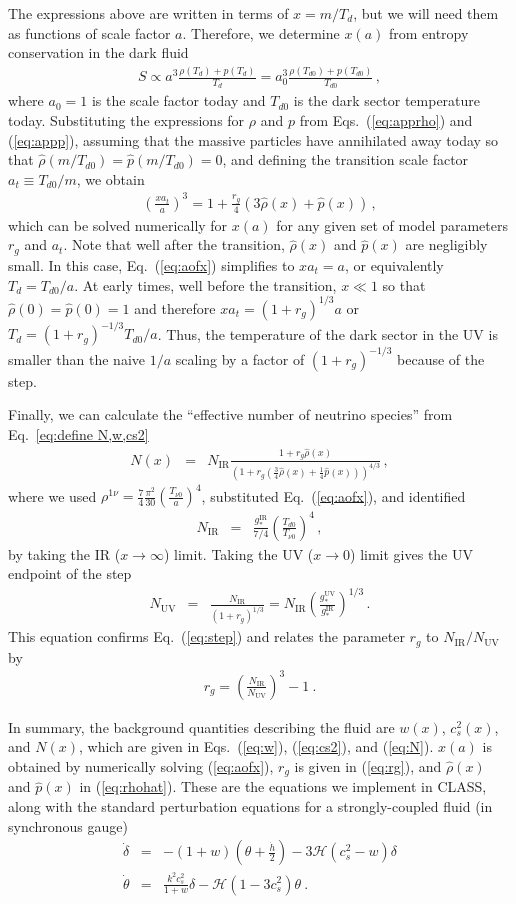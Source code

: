 \documentclass[aps,prd,twocolumn,nofootinbib,superscriptaddress]{revtex4}
\newcommand{\nir}{N_\text{IR}}
\newcommand{\nuv}{N_\text{UV}}
\def\bea{\begin{eqnarray}}
\def\eea{\end{eqnarray}}
\begin{document}
The expressions above are written in terms of $x=m/T_d$, but we will need them as functions of scale factor $a$. Therefore, we determine $x(a)$ from entropy conservation in the dark fluid
\bea
\label{eq:entropy}
S\propto a^3 \frac{\rho(T_d)+p(T_d)}{T_d} = a_0^3 \frac{\rho(T_{d0})+p(T_{d0})}{T_{d0}} 
\, ,
\eea
where $a_0=1$ is the scale factor today and $T_{d0}$ is the dark sector temperature today. Substituting the expressions for $\rho$ and $p$ from Eqs.~(\ref{eq:apprho}) and (\ref{eq:appp}), assuming that the massive particles have annihilated away today so that $\hat \rho(m/T_{d0})=\hat p(m/T_{d0})=0$, and defining the transition scale factor $a_t\equiv T_{d0}/m$, we obtain
\bea
\label{eq:aofx}
\left(\frac{x a_t}{a}\right)^3=1+\frac{r_g}{4}(3 \hat\rho(x)+\hat p(x))
\, ,
\eea
which can be solved numerically for $x(a)$ for any given set of model parameters $r_g$ and $a_t$.
Note that well after the transition, $\hat\rho(x)$ and $ \hat p(x) $ are negligibly small. In this case, Eq.~(\ref{eq:aofx}) simplifies to $x a_t= a$, or equivalently $T_d=T_{d0}/a$. At early times, well before the transition, $x\ll1$ so that $\hat\rho(0)=\hat p(0)=1$ and therefore $x a_t= (1+r_g)^{1/3}a$ or $T_d=(1+r_g)^{-1/3}T_{d0}/a$. Thus, the temperature of the dark sector in the UV is smaller than the naive $1/a$ scaling by a factor of $(1+r_g)^{-1/3}$ because of the step.

Finally, we can calculate the ``effective number of neutrino species''  from Eq.~\eqref{eq:define N,w,cs2}
\bea
\label{eq:N}
N(x) &=& \nir \frac{1+r_g\hat\rho(x)}{(1+r_g(\frac34 \hat\rho(x)+\frac14\hat p(x)))^{4/3}} 
\, ,
\eea
%
where we used
$\rho^{1\nu}=\frac74\frac{\pi^2}{30} (\frac{T_{\nu0}}{a})^4$, substituted Eq.~(\ref{eq:aofx}), and identified
\bea
\nir &=& \frac{g_*^\text{IR}}{7/4} \left(\frac{T_{d0}}{T_{\nu0}}\right)^4 
\, ,
\eea
by taking the IR ($x\rightarrow \infty$) limit.
Taking the UV ($x\rightarrow 0$) limit gives the UV endpoint of the step
\bea
\nuv&=& \frac{\nir}{(1+r_g)^{1/3}} = \nir \left(\frac{g_*^\text{UV}}{g_*^\text{IR}}\right)^{1/3}
\, .
\eea
This equation confirms Eq.~(\ref{eq:step}) and relates the parameter $r_g$ to $\nir/\nuv$ by
\bea
\label{eq:rg}
r_g=\left(\frac{\nir}{\nuv}\right)^3-1 \ .
\eea

In summary, the background quantities describing the fluid are $w(x)$, $c_s^2(x)$, and $N(x)$, which are given in Eqs.~(\ref{eq:w}), (\ref{eq:cs2}), and (\ref{eq:N}). $x(a)$ is obtained by numerically solving (\ref{eq:aofx}), $r_g$ is given in (\ref{eq:rg}), and $\hat \rho(x)$ and $\hat p(x)$ in (\ref{eq:rhohat}). These are the equations we implement in CLASS, along with the standard perturbation equations for a strongly-coupled fluid (in synchronous gauge)~\cite{Ma:1995ey}
\bea
 \label{eq:perteq}
 \dot{\delta} &=& - \left( 1 + w  \right) \left( \theta + \frac{\dot{h}}{2} \right) - 3  \mathcal{H} \left( c_s^2 - w  \right) \delta \nonumber \\
  \dot{\theta} &=& \frac{k^2 c_s^2}{1 + w} \delta -  \mathcal{H} \left(1 - 3 c_s^2 \right) \theta
 ~.
\eea
\end{document}
